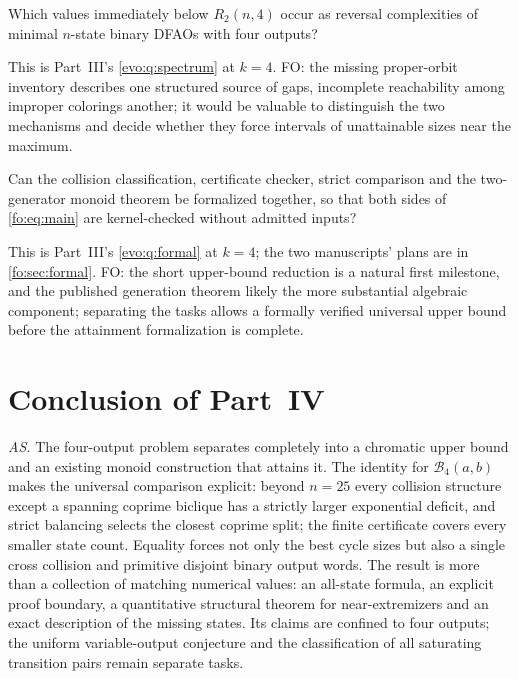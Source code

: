 \documentclass[11pt,a4paper]{article}
\numberwithin{equation}{section}
\theoremstyle{definition}
\theoremstyle{remark}
\newcommand{\Bip}{\mathcal B}
\begin{document}
\begin{question}\label{fo:fo:q:spectrum}
Which values immediately below $R_2(n,4)$ occur as reversal complexities of
minimal $n$-state binary DFAOs with four outputs?
\end{question}
This is Part~III's \cref{evo:q:spectrum} at $k=4$. FO: the missing proper-orbit
inventory describes one structured source of gaps, incomplete reachability
among improper colorings another; it would be valuable to distinguish the two
mechanisms and decide whether they force intervals of unattainable sizes near
the maximum.

\begin{question}\label{fo:fo:q:formal}
Can the collision classification, certificate checker, strict comparison and
the two-generator monoid theorem be formalized together, so that both sides of
\eqref{fo:eq:main} are kernel-checked without admitted inputs?
\end{question}
This is Part~III's \cref{evo:q:formal} at $k=4$; the two manuscripts' plans are
in \cref{fo:sec:formal}. FO: the short upper-bound reduction is a natural first
milestone, and the published generation theorem likely the more substantial
algebraic component; separating the tasks allows a formally verified universal
upper bound before the attainment formalization is complete.

\section{Conclusion of Part~IV}\label{fo:sec:conclusion}

\emph{AS.} The four-output problem separates completely into a chromatic upper
bound and an existing monoid construction that attains it. The identity for
$\Bip_4(a,b)$ makes the universal comparison explicit: beyond $n=25$ every
collision structure except a spanning coprime biclique has a strictly larger
exponential deficit, and strict balancing selects the closest coprime split;
the finite certificate covers every smaller state count. Equality forces not
only the best cycle sizes but also a single cross collision and primitive
disjoint binary output words. The result is more than a collection of matching
numerical values: an all-state formula, an explicit proof boundary, a
quantitative structural theorem for near-extremizers and an exact description
of the missing states. Its claims are confined to four outputs; the uniform
variable-output conjecture and the classification of all saturating
transition pairs remain separate tasks.
\end{document}
